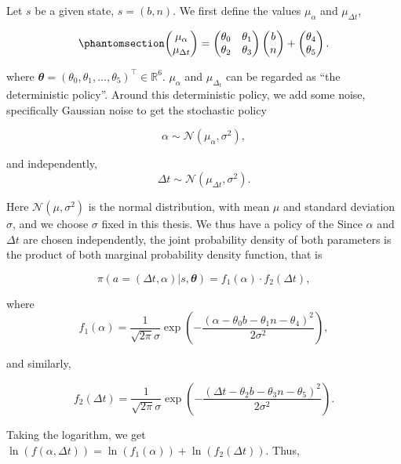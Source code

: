 \documentclass[
  letterpaper,
]{report}
\theoremstyle{definition}
\theoremstyle{plain}
\theoremstyle{definition}
\theoremstyle{remark}
\begin{document}
Let \(s\) be a given state, \(s=(b,n)\). We first define the values
\(\mu_\alpha\) and \(\mu_{\Delta t}\),

\begin{equation}\phantomsection\label{eq-policy_deterministic_part}{
\begin{pmatrix}
\mu_\alpha \\
\mu_{\Delta t}
\end{pmatrix} = 
\begin{pmatrix}
\theta_0 & \theta_1\\
\theta_2 & \theta_3
\end{pmatrix} 
\begin{pmatrix}
b\\
n
\end{pmatrix} +
\begin{pmatrix}
\theta_4\\
\theta_5
\end{pmatrix}.
}\end{equation}

where
\(\mathbfit{\theta} = (\theta_0,\theta_1,\dots, \theta_5)^\intercal \in \mathbb{R}^6\).
\(\mu_\alpha\) and \(\mu_{\Delta_t}\) can be regarded as ``the
deterministic policy''. Around this deterministic policy, we add some
noise, specifically Gaussian noise to get the stochastic policy

\[
\alpha \sim  \mathcal{N}(\mu_\alpha,\sigma^2),
\]

and independently, \[
\Delta t \sim  \mathcal{N}(\mu_{\Delta t}, \sigma^2).
\]

Here \(\mathcal{N}(\mu,\sigma^2)\) is the normal distribution, with mean
\(\mu\) and standard deviation \(\sigma\), and we choose \(\sigma\)
fixed in this thesis. We thus have a policy of the Since \(\alpha\) and
\(\Delta t\) are chosen independently, the joint probability density of
both parameters is the product of both marginal probability density
function, that is

\[
\pi(a = (\Delta t, \alpha)|s,\mathbfit{\theta})  = f_{1}(\alpha)\cdot f_{2}(\Delta t),
\]

where \[
f_1(\alpha) = \frac{1}{\sqrt{2\pi}\sigma}\exp\left(-\frac{(\alpha - \theta_0b-\theta_1n-\theta_4)^2}{2\sigma^2}\right),
\]

and similarly,

\[
f_2(\Delta t) = \frac{1}{\sqrt{2\pi}\sigma}\exp\left(-\frac{(\Delta t - \theta_2b-\theta_3n-\theta_5)^2}{2\sigma^2}\right).
\]

Taking the logarithm, we get
\(\ln(f(\alpha,\Delta t)) = \ln(f_1(\alpha)) + \ln(f_2(\Delta t))\).
Thus,
\end{document}
